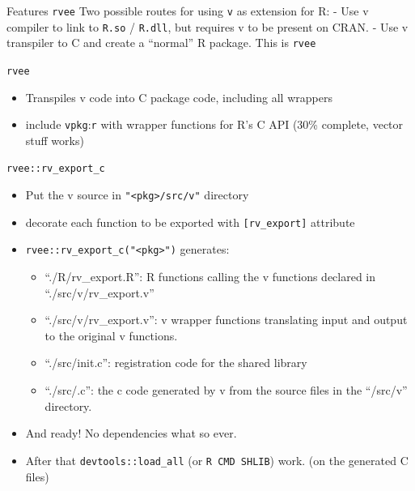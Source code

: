 \documentclass[
  ignorenonframetext,
]{beamer}
\providecommand{\tightlist}{%
  \setlength{\itemsep}{0pt}\setlength{\parskip}{0pt}}
\begin{document}
\begin{frame}[fragile]{Features \texttt{rvee}}
\protect\hypertarget{features-rvee}{}
Two possible routes for using \texttt{v} as extension for R: - Use v
compiler to link to \texttt{R.so} / \texttt{R.dll}, but requires v to be
present on CRAN. - Use v transpiler to C and create a ``normal'' R
package. This is \texttt{rvee}

\begin{block}{\texttt{rvee}}
\protect\hypertarget{rvee}{}
\begin{itemize}
\tightlist
\item
  Transpiles v code into C package code, including all wrappers
\item
  include \texttt{vpkg}:\texttt{r} with wrapper functions for R's C API
  (30\% complete, vector stuff works)
\end{itemize}
\end{block}
\end{frame}

\begin{frame}[fragile]{\texttt{rvee::rv\_export\_c}}
\protect\hypertarget{rveerv_export_c}{}
\begin{itemize}
\item
  Put the v source in \texttt{"\textless{}pkg\textgreater{}/src/v"}
  directory
\item
  decorate each function to be exported with \texttt{{[}rv\_export{]}}
  attribute
\item
  \texttt{rvee::rv\_export\_c("\textless{}pkg\textgreater{}")}
  generates:

  \begin{itemize}
  \tightlist
  \item
    ``./R/rv\_export.R'': R functions calling the v functions declared
    in ``./src/v/rv\_export.v''
  \item
    ``./src/v/rv\_export.v'': v wrapper functions translating input and
    output to the original v functions.
  \item
    ``./src/init.c'': registration code for the shared library
  \item
    ``./src/.c'': the c code generated by v from the source files in the
    ``/src/v'' directory.
  \end{itemize}
\item
  And ready! No dependencies what so ever.
\item
  After that \texttt{devtools::load\_all} (or \texttt{R\ CMD\ SHLIB})
  work. (on the generated C files)
\end{itemize}
\end{frame}
\end{document}

